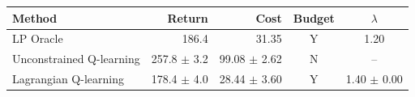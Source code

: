 \begin{tabular}{lrrcc}
\hline
Method & Return & Cost & Budget & $\lambda$ \\
\hline
LP Oracle & 186.4 & 31.35 & Y & 1.20 \\
Unconstrained Q-learning & 257.8 $\pm$ 3.2 & 99.08 $\pm$ 2.62 & N & -- \\
Lagrangian Q-learning & 178.4 $\pm$ 4.0 & 28.44 $\pm$ 3.60 & Y & 1.40 $\pm$ 0.00 \\
\hline
\end{tabular}

